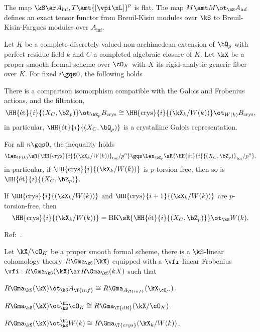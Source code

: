 \documentclass[article, a4paper, twoside]{universal}
\begin{document}
\begin{thm}
	The map $\kS\ar A_{\text{inf}}, T\amt{[\vpi\xL]}^{p}$ is flat. The map $M\amt M\ot_{\kS}A_{\text{inf}}$ defines an exact tensor functor from Breuil-Kisin modules over $\kS$ to Breuil-Kisin-Fargues modules over $A_{\text{inf}}$.
\end{thm}

\begin{thm}
	Let $K$ be a complete discretely valued non-archimedean extension of $\bQ_{p}$ with perfect residue field $k$ and $C$ a completed algebraic closure of $K$. Let $\kX$ be a proper smooth formal scheme over $\cO_{K}$ with $X$ its rigid-analytic generic fiber over $K$. For fixed $i\gqs0$, the following holds
	\begin{enr}[label=(\arabic*)]
		\item There is a comparison isomorphism compatible with the Galois and Frobenius actions, and the filtration,
		\[
			\HH{\text{{\'e}t}}{i}{(X_{C},\bZ_{p})}\ot_{\bZ_{p}}B_{\text{crys}}\cong\HH{\text{crys}}{i}{(\kX_{k}/W(k))}\ot_{W(k)}B_{\text{crys}},
		\]
		in particular, $\HH{\text{{\'e}t}}{i}{(X_{C},\bQ_{p})}$ is a crystalline Galois representation.
		\item For all $n\gqs0$, the inequality holds
		\[
			\Len_{W(k)}\sR{\HH{\text{crys}}{i}{(\kX_{k}/W(k))}_{\text{tor}}/p^{n}}\gqs\Len_{\bZ_{p}}\sR{\HH{\text{{\'e}t}}{i}{(X_{C},\bZ_{p})}_{\text{tor}}/p^{n}},
		\]
		in particular, if $\HH{\text{crys}}{i}{(\kX_{k}/W(k))}$ is $p$-torsion-free, then so is $\HH{\text{{\'e}t}}{i}{(X_{C},\bZ_{p})}$.
		\item If $\HH{\text{crys}}{i}{(\kX_{k}/W(k))}$ and $\HH{\text{crys}}{i+1}{(\kX_{k}/W(k))}$ are $p$-torsion-free, then
		\[
			\HH{\text{crys}}{i}{(\kX_{k}/W(k))}= \mathrm{BK}\sR{\HH{\text{{\'e}t}}{i}{(X_{C},\bZ_{p})}}\ot_{\kS}W(k).
		\]
	\end{enr}
\end{thm}


Ref:~\cite{BMS2019}.

\begin{thm}
	Let $\kX/\cO_{K}$ be a proper smooth formal scheme, there is a $\kS$-linear cohomology theory $R\Gma_{\kS}(\kX)$ equipped with a $\vfi$-linear Frobenius $\vfi:R\Gma_{\kS}(\kX)\ar R\Gma_{\kS}(kX)$ such that
	\begin{enr}[label=(\arabic*)]
		\item $R\Gma_{\kS}(\kX)\ot_{\kS}A_{\T{inf}}\cong R\Gma_{A_{\T{inf}}}(\kX_{\cO_{C}})$.
		\item $R\Gma_{\kS}(\kX)\ot_{\kS}^{\bL}\cO_{K}\cong R\Gma_{\T{dR}}(\kX/\cO_{K})$.
		\item $R\Gma_{\kS}(\kX)\ot_{\kS}^{\bL}W(k)\cong R\Gma_{\T{crys}}(\kX_{k}/W(k))$.
	\end{enr}
\end{thm}
\end{document}
